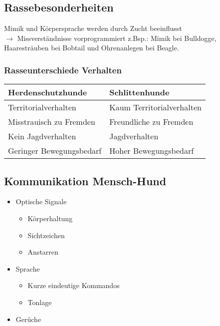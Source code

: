     \subsection{Rassebesonderheiten}
        Mimik und Körpersprache werden durch Zucht beeinflusst \\
        $\rightarrow$ Missverständnisse vorprogrammiert z.Bsp.: Mimik bei Bulldogge, Haaresträuben bei Bobtail und Ohrenanlegen bei Beagle.

        \subsubsection{Rasseunterschiede Verhalten}
            \begin{tabular}{l|l}
                \textbf{Herdenschutzhunde} & \textbf{Schlittenhunde} \\
                \hline
                Territorialverhalten & Kaum Territorialverhalten \\
                Misstrauisch zu Fremden & Freundliche zu Fremden \\
                Kein Jagdverhalten & Jagdverhalten \\
                Geringer Bewegungsbedarf & Hoher Bewegungsbedarf \\
            \end{tabular}

    \subsection{Kommunikation Mensch-Hund}
        \begin{itemize}
            \item Optische Signale
            \begin{itemize}
                \item Körperhaltung
                \item Sichtzeichen
                \item Anstarren
            \end{itemize}
            \item Sprache
            \begin{itemize}
                \item Kurze eindeutige Kommandos
                \item Tonlage
            \end{itemize}
            \item Gerüche
        \end{itemize}